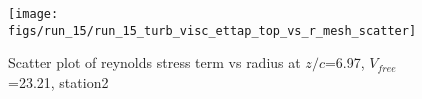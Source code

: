 \begin{figure}[H]
\centering
\texttt{[image: figs/run\_15/run\_15\_turb\_visc\_ettap\_top\_vs\_r\_mesh\_scatter]}
\caption{Scatter plot of reynolds stress term vs radius at $z/c$=6.97, $V_{free}$=23.21, station2}
\label{fig:run_15_turb_visc_ettap_top_vs_r_mesh_scatter}
\end{figure}


